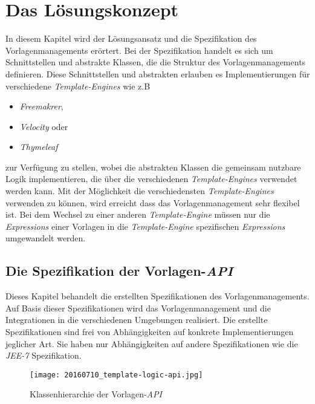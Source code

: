\chapter{Das Lösungskonzept}
\label{cha:Lösungskonzept}
In diesem Kapitel wird der Lösungsansatz und die Spezifikation des Vorlagenmanagements erörtert. Bei der Spezifikation handelt es sich um Schnittstellen und abstrakte Klassen, die die Struktur des Vorlagenmanagements definieren. Diese Schnittstellen und abstrakten erlauben es Implementierungen für verschiedene \emph{Template-Engines} wie z.B
\begin{itemize}
	\item \emph{Freemakrer},
	\item \emph{Velocity} oder
	\item \emph{Thymeleaf}
\end{itemize}
zur Verfügung zu stellen, wobei die abstrakten Klassen die gemeinsam nutzbare Logik implementieren, die über die verschiedenen \emph{Template-Engines} verwendet werden kann.
\newline
\newline
Mit der Möglichkeit die verschiedensten \emph{Template-Engines} verwenden zu können, wird erreicht dass das Vorlagenmanagement sehr flexibel ist. Bei dem Wechsel zu einer anderen \emph{Template-Engine} müssen nur die \emph{Expressions} einer Vorlagen in die \emph{Template-Engine} spezifischen \emph{Expressions} umgewandelt werden. 

\section{Die Spezifikation der Vorlagen-\emph{API}}
Dieses Kapitel behandelt die erstellten Spezifikationen des Vorlagenmanagements. Auf Basis dieser Spezifikationen wird das Vorlagenmanagement und die Integrationen in die verschiedenen Umgebungen realisiert. Die erstellte Spezifikationen sind frei von Abhängigkeiten auf konkrete Implementierungen jeglicher Art. Sie haben nur Abhängigkeiten auf andere Spezifikationen wie die \emph{JEE-7} Spezifikation.
\begin{figure}[h]
\centering
\texttt{[image: 20160710\_template-logic-api.jpg]} %
\caption{Klassenhierarchie der Vorlagen-\emph{API}}
\label{fig:template-logic-api-hierarchy}
\end{figure}
\ \newpage

